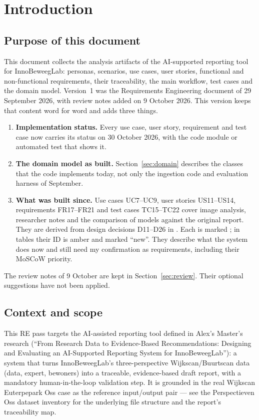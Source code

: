 \section{Introduction}\label{sec:intro}

\subsection{Purpose of this document}

This document collects the analysis artifacts of the AI-supported reporting tool for InnoBeweegLab: personas, scenarios, use cases, user stories, functional and non-functional requirements, their traceability, the main workflow, test cases and the domain model. Version~1 was the Requirements Engineering document of 29 September 2026, with review notes added on 9 October 2026. This version keeps that content word for word and adds three things.

\begin{enumerate}
\item \textbf{Implementation status.} Every use case, user story, requirement and test case now carries its status on 30 October 2026, with the code module or automated test that shows it.
\item \textbf{The domain model as built.} Section~\ref{sec:domain} describes the classes that the code implements today, not only the ingestion code and evaluation harness of September.
\item \textbf{What was built since.} Use cases UC7--UC9, user stories US11--US14, requirements FR17--FR21 and test cases TC15--TC22 cover image analysis, researcher notes and the comparison of models against the original report. They are derived from design decisions D11--D26 in . Each is marked \added; in tables their ID is amber and marked ``new''. They describe what the system does now and still need my confirmation as requirements, including their MoSCoW priority.
\end{enumerate}

The review notes of 9 October are kept in Section~\ref{sec:review}. Their optional suggestions have not been applied.

\subsection{Context and scope}

This RE pass targets the AI-assisted reporting tool defined in Alex's Master's research (``From Research Data to Evidence-Based Recommendations: Designing and Evaluating an AI-Supported Reporting System for InnoBeweegLab''): a system that turns InnoBeweegLab's three-perspective Wijkscan/Buurtscan data (data, expert, bewoners) into a traceable, evidence-based draft report, with a mandatory human-in-the-loop validation step. It is grounded in the real Wijkscan Euterpepark Oss case as the reference input/output pair --- see the Perspectieven Oss dataset inventory for the underlying file structure and the report's traceability map.

